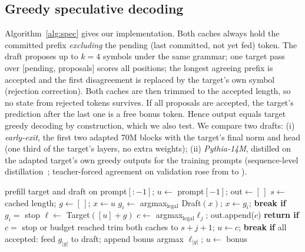 \subsection{Greedy speculative decoding}
Algorithm~\ref{alg:spec} gives our implementation. Both caches always hold the committed prefix \emph{excluding} the pending (last committed, not yet fed) token. The draft proposes up to $k{=}4$ symbols under the same grammar; one target pass over [pending, proposals] scores all positions; the longest agreeing prefix is accepted and the first disagreement is replaced by the target's own symbol (rejection correction). Both caches are then trimmed to the accepted length, so no state from rejected tokens survives. If all proposals are accepted, the target's prediction after the last one is a free bonus token. Hence output equals target greedy decoding by construction, which we also test. We compare two drafts: (i) \emph{early-exit}, the first two adapted 70M blocks with the target's final norm and head (one third of the target's layers, no extra weights); (ii) \emph{Pythia-14M}, distilled on the adapted target's own greedy outputs for the training prompts (sequence-level distillation~\cite{seqkd}; teacher-forced agreement on validation rose from \DistillBefore{} to \DistillAfter).

\begin{algorithm}[t]\caption{Greedy speculative decoding (per request)}\label{alg:spec}\footnotesize
\begin{algorithmic}[1]
\State prefill target and draft on prompt$[{:}{-}1]$; $u\gets$ prompt$[-1]$; out$\gets[\,]$
 \State $s\gets$ cached length; $g\gets[\,]$; $x\gets u$
  \State $g_i\gets$ argmax$_{\text{legal}}$ Draft$(x)$; $x\gets g_i$; \textbf{break if} $g_i=$ stop\EndFor
 \State $\ell\gets$ Target$([u]{+}g)$ 
  \State $c\gets$ argmax$_{\text{legal}}\ell_j$; out.append($c$)
  \State \textbf{return if} $c=$ stop or budget reached
   trim both caches to $s{+}j{+}1$; $u\gets c$; \textbf{break}\EndIf
 \EndFor
 \State \textbf{if} all accepted: feed $g_{|g|}$ to draft; append bonus argmax $\ell_{|g|}$; $u\gets$ bonus
\EndWhile
\end{algorithmic}\end{algorithm}

